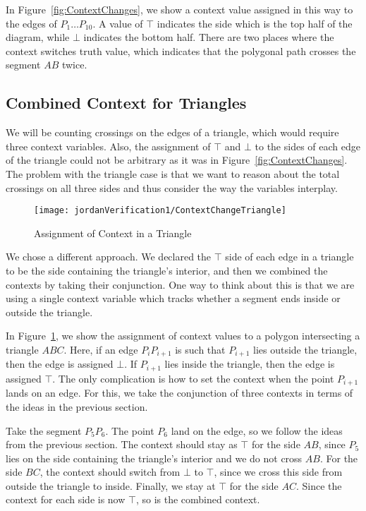 In Figure~\ref{fig:ContextChanges}, we show a context value assigned in this way to the edges of $P_1\ldots P_{10}$. A value of $\top$ indicates the side which is the top half of the diagram, while $\bot$ indicates the bottom half. There are two places where the context switches truth value, which indicates that the polygonal path crosses the segment $AB$ twice.

\subsection{Combined Context for Triangles}
We will be counting crossings on the edges of a triangle, which would require three context variables. Also, the assignment of $\top$ and $\bot$ to the sides of each edge of the triangle could not be arbitrary as it was in Figure~\ref{fig:ContextChanges}. The problem with the triangle case is that we want to reason about the total crossings on all three sides and thus consider the way the variables interplay.

\begin{figure}
\centering\texttt{[image: jordanVerification1/ContextChangeTriangle]}
\caption{Assignment of Context in a Triangle}
\label{fig:ContextChangesTriangle}
\end{figure}

We chose a different approach. We declared the $\top$ side of each edge in a triangle to be the side containing the triangle's interior, and then we combined the contexts by taking their conjunction. One way to think about this is that we are using a single context variable which tracks whether a segment ends inside or outside the triangle.

In Figure~\ref{fig:ContextChangesTriangle}, we show the assignment of context values to a polygon intersecting a triangle $ABC$. Here, if an edge $P_iP_{i+1}$ is such that $P_{i+1}$ lies outside the triangle, then the edge is assigned $\bot$. If $P_{i+1}$ lies inside the triangle, then the edge is assigned $\top$. The only complication is how to set the context when the point $P_{i+1}$ lands on an edge. For this, we take the conjunction of three contexts in terms of the ideas in the previous section.

Take the segment $P_5P_6$. The point $P_6$ land on the edge, so we follow the ideas from the previous section. The context should stay as $\top$ for the side $AB$, since $P_5$ lies on the side containing the triangle's interior and we do not cross $AB$. For the side $BC$, the context should switch from $\bot$ to $\top$, since we cross this side from outside the triangle to inside. Finally, we stay at $\top$ for the side $AC$. Since the context for each side is now $\top$, so is the combined context.

